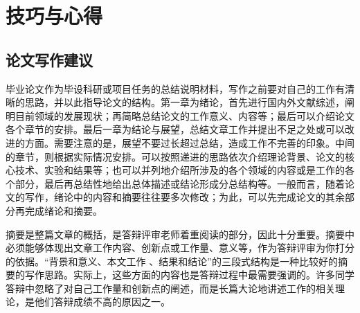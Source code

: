%
%
%
%
%
%
%

\chapter{技巧与心得}

\section{论文写作建议}
毕业论文作为毕设科研或项目任务的总结说明材料，写作之前要对自己的工作有清晰的思路，并以此指导论文的结构。第一章为绪论，首先进行国内外文献综述，阐明目前领域的发展现状；再简略总结论文的工作意义、内容等；最后可以介绍论文各个章节的安排。最后一章为结论与展望，总结文章工作并提出不足之处或可以改进的方面。需要注意的是，展望不要过长超过总结，造成工作不完善的印象。中间的章节，则根据实际情况安排。可以按照递进的思路依次介绍理论背景、论文的核心技术、实验和结果等；也可以并列地介绍所涉及的各个领域的内容或是工作的各个部分，最后再总结性地给出总体描述或结论形成分总结构等。一般而言，随着论文的写作，绪论中的内容和摘要往往要多次修改；为此，可以先完成论文的其余部分再完成绪论和摘要。

摘要是整篇文章的概括，是答辩评审老师着重阅读的部分，因此十分重要。摘要中必须能够体现出文章工作内容、创新点或工作量、意义等，作为答辩评审为你打分的依据。``背景和意义、本文工作 、结果和结论''的三段式结构是一种比较好的摘要的写作思路。实际上，这些方面的内容也是答辩过程中最需要强调的。许多同学答辩中忽略了对自己工作量和创新点的阐述，而是长篇大论地讲述工作的相关理论，是他们答辩成绩不高的原因之一。

